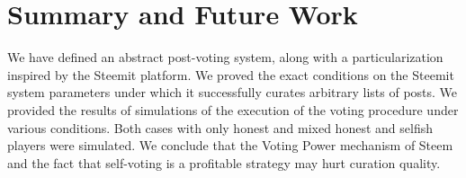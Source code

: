 \section{Summary and Future Work}

  We have defined an abstract post-voting system, along with a particularization
  inspired by the Steemit platform. We proved the exact conditions on the
  Steemit system parameters under which it successfully curates arbitrary lists
  of posts. We provided the results of simulations of the execution of the
  voting procedure under various conditions. Both cases with only honest and
  mixed honest and selfish players were simulated. We conclude that the Voting
  Power mechanism of Steem and the fact that self-voting is a profitable
  strategy may hurt curation quality.
